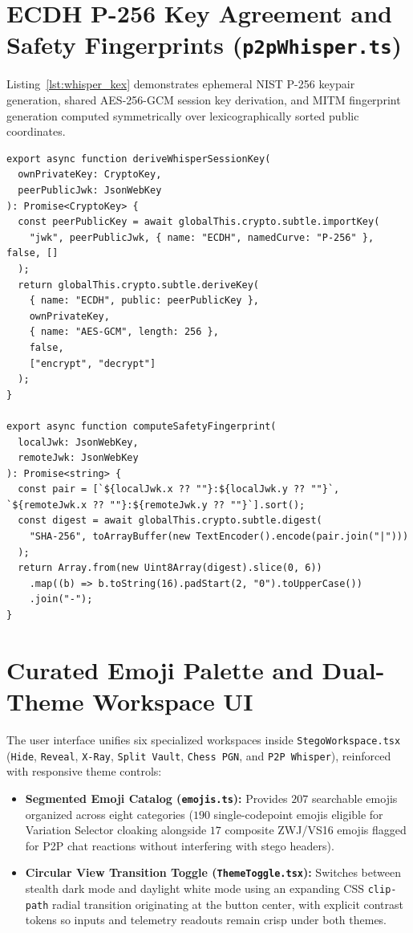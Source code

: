 \documentclass[12pt,a4paper,oneside,openany]{report}
\begin{document}
\section{ECDH P-256 Key Agreement and Safety Fingerprints (\texttt{p2pWhisper.ts})}
Listing~\ref{lst:whisper_kex} demonstrates ephemeral NIST P-256 keypair generation, shared AES-256-GCM session key derivation, and MITM fingerprint generation computed symmetrically over lexicographically sorted public coordinates.

\begin{lstlisting}[caption=Ephemeral ECDH Session Derivation and SHA-256 Verification Fingerprint, label={lst:whisper_kex}]
export async function deriveWhisperSessionKey(
  ownPrivateKey: CryptoKey,
  peerPublicJwk: JsonWebKey
): Promise<CryptoKey> {
  const peerPublicKey = await globalThis.crypto.subtle.importKey(
    "jwk", peerPublicJwk, { name: "ECDH", namedCurve: "P-256" }, false, []
  );
  return globalThis.crypto.subtle.deriveKey(
    { name: "ECDH", public: peerPublicKey },
    ownPrivateKey,
    { name: "AES-GCM", length: 256 },
    false,
    ["encrypt", "decrypt"]
  );
}

export async function computeSafetyFingerprint(
  localJwk: JsonWebKey,
  remoteJwk: JsonWebKey
): Promise<string> {
  const pair = [`${localJwk.x ?? ""}:${localJwk.y ?? ""}`, `${remoteJwk.x ?? ""}:${remoteJwk.y ?? ""}`].sort();
  const digest = await globalThis.crypto.subtle.digest(
    "SHA-256", toArrayBuffer(new TextEncoder().encode(pair.join("|")))
  );
  return Array.from(new Uint8Array(digest).slice(0, 6))
    .map((b) => b.toString(16).padStart(2, "0").toUpperCase())
    .join("-");
}
\end{lstlisting}

\section{Curated Emoji Palette and Dual-Theme Workspace UI}
The user interface unifies six specialized workspaces inside \texttt{StegoWorkspace.tsx} (\texttt{Hide}, \texttt{Reveal}, \texttt{X-Ray}, \texttt{Split Vault}, \texttt{Chess PGN}, and \texttt{P2P Whisper}), reinforced with responsive theme controls:
\begin{itemize}
    \item \textbf{Segmented Emoji Catalog (\texttt{emojis.ts}):} Provides $207$ searchable emojis organized across eight categories ($190$ single-codepoint emojis eligible for Variation Selector cloaking alongside $17$ composite ZWJ/VS16 emojis flagged for P2P chat reactions without interfering with stego headers).
    \item \textbf{Circular View Transition Toggle (\texttt{ThemeToggle.tsx}):} Switches between stealth dark mode and daylight white mode using an expanding CSS \texttt{clip-path} radial transition originating at the button center, with explicit contrast tokens so inputs and telemetry readouts remain crisp under both themes.
\end{itemize}
\end{document}
